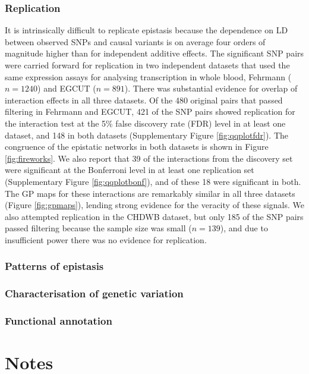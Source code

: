 \documentclass{article}
\begin{document}
\subsubsection{Replication}
It is intrinsically difficult to replicate epistasis because the dependence on LD between observed SNPs and causal variants is on average four orders of magnitude higher than for independent additive effects. The significant SNP pairs were carried forward for replication in two independent datasets that used the same expression assays for analysing transcription in whole blood, Fehrmann ($n=1240$) and EGCUT ($n=891$). There was substantial evidence for overlap of interaction effects in all three datasets. Of the 480 original pairs that passed filtering in Fehrmann and EGCUT, 421 of the SNP pairs showed replication for the interaction test at the 5\% false discovery rate (FDR) level in at least one dataset, and 148 in both datasets (Supplementary Figure \ref{fig:qqplotfdr}). The congruence of the epistatic networks in both datasets is shown in Figure \ref{fig:fireworks}. We also report that 39 of the interactions from the discovery set were significant at the Bonferroni level in at least one replication set (Supplementary Figure \ref{fig:qqplotbonf}), and of these 18 were significant in both. The GP maps for these interactions are remarkably similar in all three datasets (Figure \ref{fig:gpmaps}), lending strong evidence for the veracity of these signals. We also attempted replication in the CHDWB dataset, but only 185 of the SNP pairs passed filtering because the sample size was small ($n=139$), and due to insufficient power there was no evidence for replication.


\subsubsection{Patterns of epistasis}



\subsubsection{Characterisation of genetic variation}



\subsubsection{Functional annotation}




\section{Notes}
\end{document}
